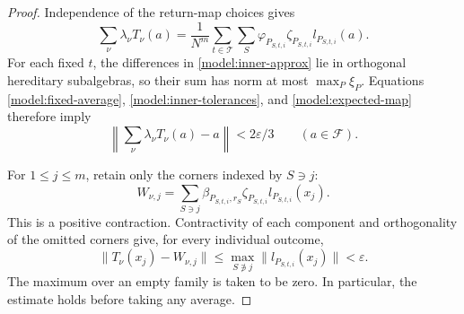\begin{proof}
Independence of the return-map choices gives
\begin{equation}
 \label{model:expected-map}
 \sum_\nu\lambda_\nu T_\nu(a)
   =\frac1{N^m}\sum_{t\in\mathcal T}\sum_S
       \varphi_{P_{S,t,i}}\zeta_{P_{S,t,i}}l_{P_{S,t,i}}(a).
\end{equation}
For each fixed $t$, the differences in
\eqref{model:inner-approx} lie in orthogonal hereditary
subalgebras, so their sum has norm at most $\max_P\xi_P$.
Equations \eqref{model:fixed-average},
\eqref{model:inner-tolerances}, and \eqref{model:expected-map}
therefore imply
\begin{equation}
 \label{model:expected-approximation}
 \left\|\sum_\nu\lambda_\nu T_\nu(a)-a\right\|
    <2\varepsilon/3\qquad(a\in\mathcal F).
\end{equation}

For $1\leq j\leq m$, retain only the corners indexed by $S\ni j$:
\begin{equation}
 \label{model:outcome-retained}
 W_{\nu,j}=
    \sum_{S\ni j}\beta_{P_{S,t,i},r_S}
                \zeta_{P_{S,t,i}}l_{P_{S,t,i}}(x_j).
\end{equation}
This is a positive contraction.  Contractivity of each component
and orthogonality of the omitted corners give, for every
individual outcome,
\begin{equation}
 \label{model:before-averaging}
 \|T_\nu(x_j)-W_{\nu,j}\|
   \leq\max_{S\not\ni j}\|l_{P_{S,t,i}}(x_j)\|
   <\varepsilon.
\end{equation}
The maximum over an empty family is taken to be zero.  In
particular, the estimate holds before taking any average.


\end{proof}
